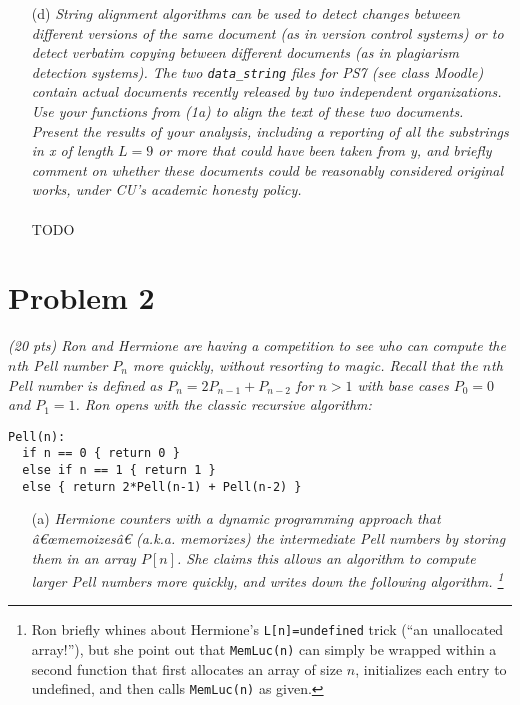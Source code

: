 \documentclass[11pt]{article} \setlength{\oddsidemargin}{0in}
\begin{document}
{\begin{enumerate}
    \textit{Hint: Convert this problem into a form that allows us to
      apply an algorithm weâ€™ve already seen.}
    \\\\
    TODO
    \\
  \item[(d)] \textit{String alignment algorithms can be used to detect
      changes between different versions of the same document (as in
      version control systems) or to detect verbatim copying between
      different documents (as in plagiarism detection systems).  The
      two \texttt{data\_string} files for PS7 (see class Moodle)
      contain actual documents recently released by two independent
      organizations. Use your functions from (1a) to align the text of
      these two documents. Present the results of your analysis,
      including a reporting of all the substrings in x of length
      $L = 9$ or more that could have been taken from y, and briefly
      comment on whether these documents could be reasonably
      considered original works, under CU's academic honesty policy.}
    \\\\
    TODO
  \end{enumerate}

  \newpage

  \section*{Problem 2}

  \textit{(20 pts) Ron and Hermione are having a competition to see
    who can compute the $n$th Pell number $P_n$ more quickly, without
    resorting to magic. Recall that the $n$th Pell number is defined
    as $P_n = 2 P_{n-1} + P_{n-2}$ for $n > 1$ with base cases
    $P_0 = 0$ and $P_1 = 1$.  Ron opens with the classic recursive
    algorithm:}

\begin{verbatim}
Pell(n):
  if n == 0 { return 0 }
  else if n == 1 { return 1 }
  else { return 2*Pell(n-1) + Pell(n-2) }
\end{verbatim}

  \begin{enumerate}
  \item[(a)]{\textit{Hermione counters with a dynamic programming
        approach that â€œmemoizesâ€ (a.k.a.  memorizes) the intermediate
        Pell numbers by storing them in an array $P[n]$. She claims
        this allows an algorithm to compute larger Pell numbers more
        quickly, and writes down the following
        algorithm. \footnote{Ron briefly whines about Hermione's
          \texttt{L[n]=undefined} trick (``an unallocated array!''),
          but she point out that \texttt{MemLuc(n)} can simply be
          wrapped within a second function that first allocates an
          array of size $n$, initializes each entry to undefined, and
          then calls \texttt{MemLuc(n)} as given.}}}


\end{enumerate}}
\end{document}
